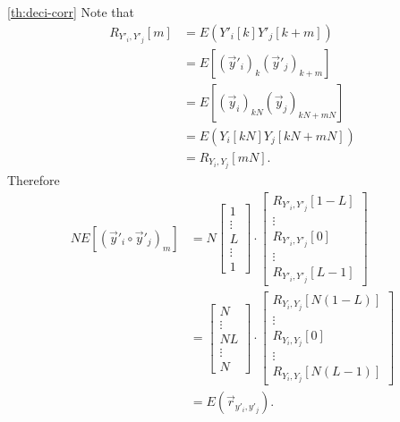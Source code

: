 \documentclass[a4paper, openany, oneside]{memoir}
\begin{document}
\begin{blockProofTheorem}{\ref{th:deci-corr}}
    Note that
    \begin{align*}
        R_{Y'_i,Y'_j}[m]
        &= E(Y'_i[k]Y'_j[k+m]) \\
        &= E[(\vec{y}'_i)_{k}(\vec{y}'_j)_{k+m}] \\
        &= E[(\vec{y}_i)_{kN}(\vec{y}_j)_{kN+mN}] \\
        &= E(Y_i[kN]Y_j[kN+mN]) \\
        &= R_{Y_i,Y_j}[mN].
    \end{align*}
    Therefore
    \begin{align*}
        N E[(\vec{y}'_i \circ \vec{y}'_j)_m]
        &= N\begin{bmatrix}
            1 \\
            \vdots \\
            L \\
            \vdots \\
            1
        \end{bmatrix} \cdot \begin{bmatrix}
            R_{Y'_i,Y'_j}[1-L] \\
            \vdots \\
            R_{Y'_i,Y'_j}[0] \\
            \vdots \\
            R_{Y'_i,Y'_j}[L-1]
        \end{bmatrix} \\
        &= \begin{bmatrix}
            N \\
            \vdots \\
            NL \\
            \vdots \\
            N
        \end{bmatrix} \cdot \begin{bmatrix}
            R_{Y_i,Y_j}[N(1-L)] \\
            \vdots \\
            R_{Y_i,Y_j}[0] \\
            \vdots \\
            R_{Y_i,Y_j}[N(L-1)]
        \end{bmatrix} \\
        &= E(\vec{r}_{y'_i,y'_j}).
    \end{align*}
\end{blockProofTheorem}
\end{document}

